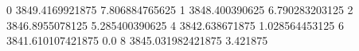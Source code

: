 0 3849.4169921875 7.806884765625
1 3848.400390625 6.790283203125
2 3846.8955078125 5.285400390625
4 3842.638671875 1.028564453125
6 3841.610107421875 0.0
8 3845.031982421875 3.421875
